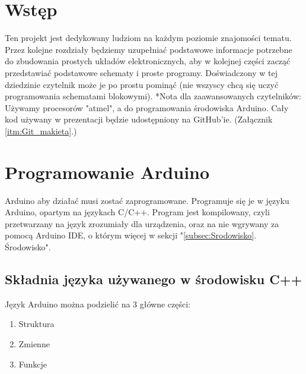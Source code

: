 \documentclass[a4paper,12pt, twoside]{article}
\let\oldsection\section		%
\renewcommand\section{\clearpage\oldsection}%
\begin{document}

\tableofcontents 
{}
\thispagestyle {empty}

\section*{Wstęp}
Ten projekt jest dedykowany ludziom na każdym poziomie znajomości tematu. Przez kolejne rozdziały będziemy uzupełniać podstawowe informacje potrzebne do zbudowania prostych układów elektronicznych, aby w kolejnej części zacząć przedstawiać podstawowe schematy i proste programy. Doświadczony w tej dziedzinie czytelnik może je po prostu pominąć (nie wszyscy chcą się uczyć programowania schematami blokowymi). 
*Nota dla zaawansowanych czytelników:
Używamy procesorów "atmel", a do programowania środowiska Arduino. Cały kod używany w prezentacji będzie udostępniony na GitHub'ie. (Załącznik \ref{itm:Git_makieta}.)

\section{Programowanie Arduino}

Arduino aby działać musi zostać zaprogramowane. Programuje się je w języku Arduino, opartym na językach C/C++.
Program jest kompilowany, czyli przetwarzany na język zrozumiały dla urządzenia, oraz na nie wgrywany za pomocą
Arduino IDE, o którym więcej w sekcji "\ref{subsec:Srodowisko}. Środowisko". 


\subsection {Składnia języka używanego w środowisku C++}
  Język Arduino można podzielić na 3 główne części:
  \begin{enumerate}
	\item Struktura
	\item Zmienne
	\item Funkcje
\end{enumerate}
\end{document}
